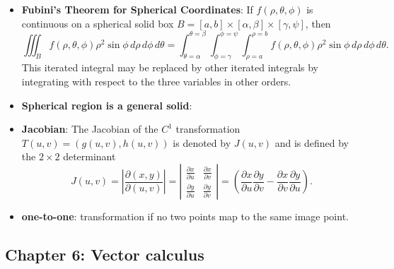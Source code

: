 \documentclass{report}
\begin{document}
\begin{itemize}
    \item \textbf{Fubini’s Theorem for Spherical Coordinates}:
        If \(f(\rho, \theta, \phi)\) is continuous on a spherical solid box \(B = [a,b] \times [\alpha,\beta] \times [\gamma,\psi]\), then
        \[
            \iiint_B f(\rho, \theta, \phi) \rho^2 \sin \phi \, d\rho \, d\phi \, d\theta = \int_{\theta=\alpha}^{\theta=\beta} \int_{\phi=\gamma}^{\phi=\psi} \int_{\rho=a}^{\rho=b} f(\rho, \theta, \phi) \rho^2 \sin \phi \, d\rho \, d\phi \, d\theta.
        \]
        This iterated integral may be replaced by other iterated integrals by integrating with respect to the three variables in other orders.
    \item \textbf{Spherical region is a general solid}:
    \item \textbf{Jacobian}:
            The Jacobian of the \(C^1\) transformation \(T(u,v) = (g(u,v), h(u,v))\) is denoted by \(J(u,v)\) and is defined by the \(2 \times 2\) determinant
            \[
                J(u,v) = \left| \frac{\partial(x,y)}{\partial(u,v)} \right| = \left| \begin{array}{cc}
                    \frac{\partial x}{\partial u} & \frac{\partial x}{\partial v} \\
                    \frac{\partial y}{\partial u} & \frac{\partial y}{\partial v}
                \end{array} \right| = \left( \frac{\partial x}{\partial u} \frac{\partial y}{\partial v} - \frac{\partial x}{\partial v} \frac{\partial y}{\partial u} \right).
            \]
        \item \textbf{one-to-one}: transformation if no two points map to the same image point.
    \end{itemize}

    \pagebreak 
    \subsection{Chapter 6: Vector calculus}
    \bigbreak \noindent 
\end{document}
